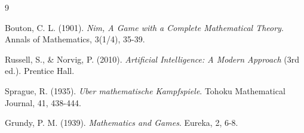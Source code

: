 \documentclass[12pt,a4paper]{article}
\theoremstyle{definition}
\begin{document}
\begin{thebibliography}{9}

Bouton, C. L. (1901).
\textit{Nim, A Game with a Complete Mathematical Theory}.
Annals of Mathematics, 3(1/4), 35-39.

Russell, S., \& Norvig, P. (2010).
\textit{Artificial Intelligence: A Modern Approach} (3rd ed.).
Prentice Hall.

Sprague, R. (1935).
\textit{Uber mathematische Kampfspiele}.
Tohoku Mathematical Journal, 41, 438-444.

Grundy, P. M. (1939).
\textit{Mathematics and Games}.
Eureka, 2, 6-8.

\end{thebibliography}
\end{document}
